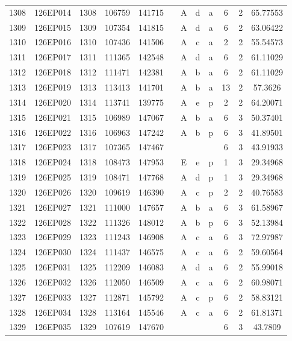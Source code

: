 \begin{tabular}{|*{12}{c|}}
1308 & 126EP014 & 1308 & 106759 & 141715 &  & A & d & a & 6 & 2 & 65.77553 \\ 
1309 & 126EP015 & 1309 & 107354 & 141815 &  & A & d & a & 6 & 2 & 63.06422 \\ 
1310 & 126EP016 & 1310 & 107436 & 141506 &  & A & c & a & 2 & 2 & 55.54573 \\ 
1311 & 126EP017 & 1311 & 111365 & 142548 &  & A & d & a & 6 & 2 & 61.11029 \\ 
1312 & 126EP018 & 1312 & 111471 & 142381 &  & A & b & a & 6 & 2 & 61.11029 \\ 
1313 & 126EP019 & 1313 & 113413 & 141701 &  & A & b & a & 13 & 2 & 57.3626 \\ 
1314 & 126EP020 & 1314 & 113741 & 139775 &  & A & e & p & 2 & 2 & 64.20071 \\ 
1315 & 126EP021 & 1315 & 106989 & 147067 &  & A & b & a & 6 & 3 & 50.37401 \\ 
1316 & 126EP022 & 1316 & 106963 & 147242 &  & A & b & p & 6 & 3 & 41.89501 \\ 
1317 & 126EP023 & 1317 & 107365 & 147467 &  &  &  &  & 6 & 3 & 43.91933 \\ 
1318 & 126EP024 & 1318 & 108473 & 147953 &  & E & e & p & 1 & 3 & 29.34968 \\ 
1319 & 126EP025 & 1319 & 108471 & 147768 &  & A & d & p & 1 & 3 & 29.34968 \\ 
1320 & 126EP026 & 1320 & 109619 & 146390 &  & A & c & p & 2 & 2 & 40.76583 \\ 
1321 & 126EP027 & 1321 & 111000 & 147657 &  & A & b & a & 6 & 3 & 61.58967 \\ 
1322 & 126EP028 & 1322 & 111326 & 148012 &  & A & b & p & 6 & 3 & 52.13984 \\ 
1323 & 126EP029 & 1323 & 111243 & 146908 &  & A & c & a & 6 & 3 & 72.97987 \\ 
1324 & 126EP030 & 1324 & 111437 & 146575 &  & A & c & a & 6 & 2 & 59.60564 \\ 
1325 & 126EP031 & 1325 & 112209 & 146083 &  & A & d & a & 6 & 2 & 55.99018 \\ 
1326 & 126EP032 & 1326 & 112050 & 146509 &  & A & c & a & 6 & 2 & 60.98071 \\ 
1327 & 126EP033 & 1327 & 112871 & 145792 &  & A & c & p & 6 & 2 & 58.83121 \\ 
1328 & 126EP034 & 1328 & 113164 & 145546 &  & A & c & a & 6 & 2 & 61.81371 \\ 
1329 & 126EP035 & 1329 & 107619 & 147670 &  &  &  &  & 6 & 3 & 43.7809 \\ 

\end{tabular}
